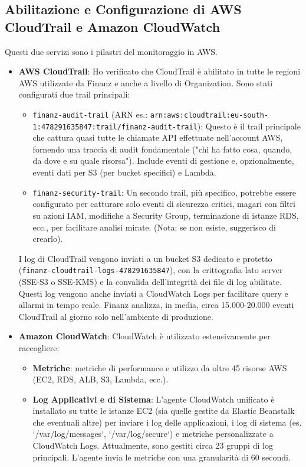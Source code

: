 \subsection{Abilitazione e Configurazione di AWS CloudTrail e Amazon CloudWatch}
\label{subsec:cloudtrail-cloudwatch-enable_cap2}
Questi due servizi sono i pilastri del monitoraggio in AWS.
\begin{itemize}
    \item \textbf{AWS CloudTrail}: Ho verificato che CloudTrail è abilitato in tutte le regioni AWS utilizzate da Finanz e anche a livello di Organization. Sono stati configurati due trail principali:
        \begin{itemize}
            \item \texttt{finanz-audit-trail} (ARN es.: \texttt{arn:aws:cloudtrail:eu-south-1:478291635847:trail/finanz-audit-trail}): Questo è il trail principale che cattura quasi tutte le chiamate API effettuate nell'account AWS, fornendo una traccia di audit fondamentale ("chi ha fatto cosa, quando, da dove e su quale risorsa"). Include eventi di gestione e, opzionalmente, eventi dati per S3 (per bucket specifici) e Lambda.
            \item \texttt{finanz-security-trail}: Un secondo trail, più specifico, potrebbe essere configurato per catturare solo eventi di sicurezza critici, magari con filtri su azioni IAM, modifiche a Security Group, terminazione di istanze RDS, ecc., per facilitare analisi mirate. (Nota: se non esiste, suggerisco di crearlo).
        \end{itemize}
        I log di CloudTrail vengono inviati a un bucket S3 dedicato e protetto (\texttt{finanz-cloudtrail-logs-478291635847}), con la crittografia lato server (SSE-S3 o SSE-KMS) e la convalida dell'integrità dei file di log abilitate. Questi log vengono anche inviati a CloudWatch Logs per facilitare query e allarmi in tempo reale. Finanz analizza, in media, circa 15.000-20.000 eventi CloudTrail al giorno solo nell'ambiente di produzione.
    \item \textbf{Amazon CloudWatch}: CloudWatch è utilizzato estensivamente per raccogliere:
        \begin{itemize}
            \item \textbf{Metriche}: metriche di performance e utilizzo da oltre 45 risorse AWS (EC2, RDS, ALB, S3, Lambda, ecc.).
            \item \textbf{Log Applicativi e di Sistema}: L'agente CloudWatch unificato è installato su tutte le istanze EC2 (sia quelle gestite da Elastic Beanstalk che eventuali altre) per inviare i log delle applicazioni, i log di sistema (es. `/var/log/messages`, `/var/log/secure`) e metriche personalizzate a CloudWatch Logs. Attualmente, sono gestiti circa 23 gruppi di log principali. L'agente invia le metriche con una granularità di 60 secondi.

\end{itemize}
\end{itemize}
